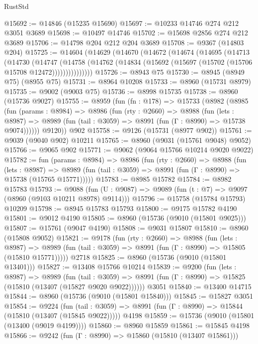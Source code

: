 \begin{lexlean}{RustStd}
\begin{coremodule}
@15692 := @14846 (@15235 @15690)
@15697 := @10233 @14746 @274 @212 @3051 @3689
@15698 := @10497 @14746
@15702 := @15698 @2856 @274 @212 @3689
@15706 := @14798 @204 @212 @204 @3689
@15708 := @9367 (@14803 @204)
@15725 := @14604
    (@14629
      (@14670
        (@14672
          (@14674
            (@14695
              (@14713
                (@14730
                  (@14747
                    (@14758
                      (@14762 (@14834 (@15692 (@15697 (@15702 (@15706 @15708 @12472)))))))))))))))
@15726 := @8943 @75
@15730 := @8945 (@8949 @75) (@8955 @75)
@15731 := @8964 @10208
@15733 := @8960 (@15731 @8979)
@15735 := @9002 (@9003 @75)
@15736 := @8998 @15735
@15738 := @8960 (@15736 @9027)
@15755 := @8959
    (fun (fn : @178) =>
    @15733
      (@8982
        (@8985
          (fun (params : @8984) =>
          @8986
            (fun (rty : @2660) =>
            @8988
              (fun (lets : @8987) =>
              @8989 (fun (tail : @3059) => @8991 (fun (Γ : @8990) => @15738 @9074))))))
        @9120))
    @902
@15758 := @9126 (@15731 (@8977 @902))
@15761 := @9039 (@9040 @902) @10211
@15765 := @8960 (@9031 (@15761 @9048) @9052)
@15766 := @9065 @902
@15771 := @9062 (@9064 @15766 @10214 @9020 @9022)
@15782 := fun (params : @8984) =>
  @8986
    (fun (rty : @2660) =>
    @8988
      (fun (lets : @8987) =>
      @8989 (fun (tail : @3059) => @8991 (fun (Γ : @8990) => @15738 (@15765 @15771)))))
@15783 := @8985 @15782
@15784 := @8982 @15783
@15793 := @9088
    (fun (U : @9087) => @9089 (fun (t : @7) => @9097 (@8960 (@9103 @10211 @8978) @9114)))
@15796 := @15758 (@15784 @15793) @10209
@15798 := @8945 @15783 @15793
@15800 := @9175 @15782 @4190
@15801 := @9012 @4190
@15805 := @8960 (@15736 (@9010 (@15801 @9025)))
@15807 := @15761 (@9047 @4190)
@15808 := @9031 @15807
@15810 := @8960 (@15808 @9052)
@15821 := @9178
    (fun (rty : @2660) =>
    @8988
      (fun (lets : @8987) =>
      @8989 (fun (tail : @3059) => @8991 (fun (Γ : @8990) => @15805 (@15810 @15771)))))
    @2718
@15825 := @8960 (@15736 (@9010 (@15801 @13401)))
@15827 := @13408 @15766 @10214
@15839 := @9200
    (fun (lets : @8987) =>
    @8989
      (fun (tail : @3059) =>
      @8991 (fun (Γ : @8990) => @15825 (@15810 (@13407 (@15827 @9020 @9022))))))
    @3051
@15840 := @13400 @14715
@15844 := @8960 (@15736 (@9010 (@15801 @15840)))
@15845 := @15827 @3051
@15854 := @9224
    (fun (tail : @3059) => @8991 (fun (Γ : @8990) => @15844 (@15810 (@13407 (@15845 @9022)))))
    @4198
@15859 := @15736 (@9010 (@15801 (@13400 (@9019 @4199))))
@15860 := @8960 @15859
@15861 := @15845 @4198
@15866 := @9242 (fun (Γ : @8990) => @15860 (@15810 (@13407 @15861)))

\end{coremodule}
\end{lexlean}

